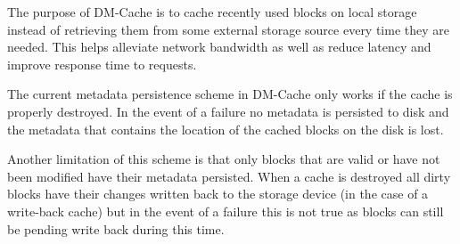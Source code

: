 The purpose of DM-Cache is to cache recently used blocks on local
storage instead of retrieving them from some external storage source
every time they are needed. This helps alleviate network bandwidth as
well as reduce latency and improve response time to requests.

The current metadata persistence scheme in DM-Cache only works if the
cache is properly destroyed. In the event of a failure no metadata is
persisted to disk and the metadata that contains the location of the
cached blocks on the disk is lost.

Another limitation of this scheme is that only blocks that are valid
or have not been modified have their metadata persisted. When a cache
is destroyed all dirty blocks have their changes written back to the
storage device (in the case of a write-back cache) but in the event of
a failure this is not true as blocks can still be pending write back
during this time.
